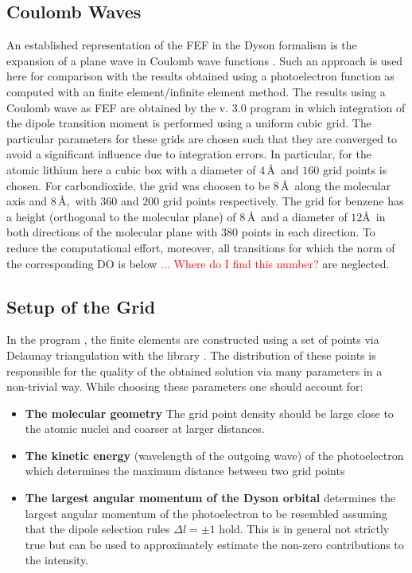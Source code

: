 \subsection{Coulomb Waves}
An established representation of the FEF in the Dyson formalism is the expansion of a plane wave in Coulomb wave functions \cite{ezDyson,do_modCoul,DO_TDDFT}.
Such an approach is used here for comparison with the results obtained using a photoelectron function as computed with an finite element/infinite element method.
The results using a Coulomb wave as FEF are obtained by the  v. 3.0 \cite{ezDyson} program in which integration of the dipole transition moment  is performed using a uniform cubic grid.
The particular parameters for these grids are chosen such that they are converged to avoid a significant influence due to integration errors.
In particular, for the atomic lithium here a cubic box with a diameter of $4\,$\AA\, and $160$ grid points is chosen.
For carbondioxide, the grid was choosen to be $8\,$\AA\,  along the molecular axis and $8\,$\AA,\ with $360$ and $200$ grid points respectively.
The grid for benzene has a height (orthogonal to the molecular plane) of $8\,$\AA\, and a diameter of $12$\AA\, in both directions of the molecular plane with $380$ points in each direction.
To reduce the computational effort, moreover, all transitions for which the norm of the corresponding DO is below \textcolor{red}{$...$ Where do I find this number?} are neglected.

\subsection{Setup of the Grid}
\label{ch:GridSetup}
In the program , the finite elements are constructed using a set of points via Delaunay triangulation %
with the library  \cite{tetgen}.
The distribution of these points is responsible for the quality of the obtained solution via many parameters in a non-trivial way.
While choosing these parameters one should account for:
\begin{itemize}
   \item \textbf{The molecular geometry} The grid point density should be large close to the atomic nuclei and coarser at larger distances.
   \item \textbf{The kinetic energy} (wavelength of the outgoing wave) of the photoelectron which determines the maximum distance between two grid points
   \item \textbf{The largest angular momentum of the Dyson orbital} determines the largest angular momentum of the photoelectron to be resembled assuming that the dipole selection rules $\Delta l=\pm 1$ hold.
   This is in general not strictly true but can be used to approximately estimate the non-zero contributions to the intensity.
\end{itemize}

